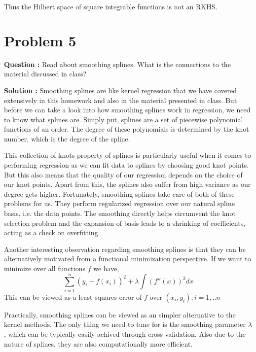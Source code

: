 \documentclass[a4paper, 11pt]{article}
\begin{document}
Thus the Hilbert  space  of square integrable functions is not an RKHS.

\clearpage

\section*{Problem 5}

\textbf{Question :} Read about smoothing splines.  What is the connections to the material discussed in class?

\textbf{Solution :} Smoothing splines are like kernel regression that we have covered extensively in this homework and also in the material presented in class. But before we can take a look into how smoothing splines work in regression, we need to know what splines are. Simply put, splines are a set of piecewise polynomial functions of an order. The degree of these polynomials is determined by the knot number, which is the degree of the spline.

This collection of knots property of splines is particularly useful when it comes to performing regression as we can fit data to splines by choosing good knot points. But this also means that the quality of our regression depends on the choice of our knot points. Apart from this, the splines also suffer from high variance as our degree gets higher. Fortunately, smoothing splines take care of both of these problems for us. They perform regularized regression over our natural spline basis, i.e. the data points. The smoothing directly helps circumvent the knot selection problem and the expansion of basis leads to a shrinking of coefficients, acting as a check on overfitting.

Another interesting observation regarding smoothing splines is that they can be alternatively motivated from a functional minimization perspective. If we want to minimize over all functions $f$ we have,  $$\sum_{i=1}^n (y_i - f(x_i))^2 + \lambda \int (f''(x))^2dx $$
This can be viewed as a least squares error of $f$ over $(x_i, y_i), i=1, ..n$

Practically, smoothing splines can be viewed as an simpler alternative to the kernel methods. The only thing we need to tune for is the smoothing parameter $\lambda$, which can be typically easily achived through cross-validation. Also due to the nature of splines, they are also computationally more efficient.
\end{document}
